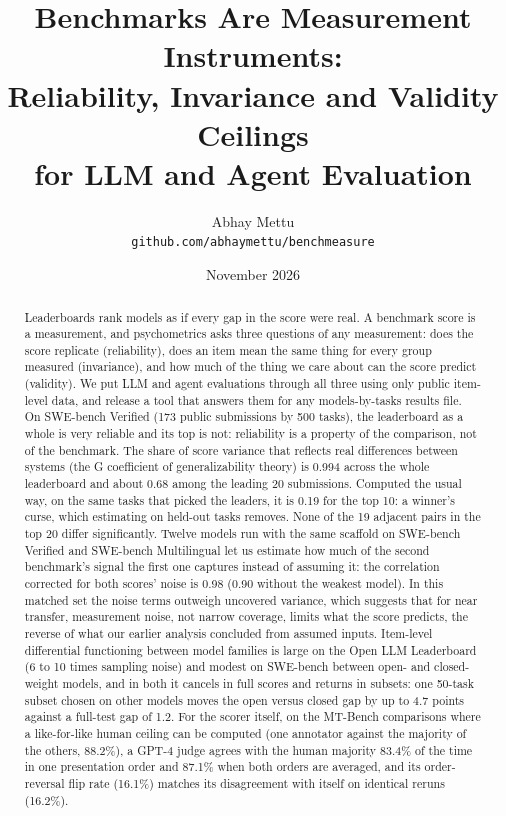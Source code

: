 \documentclass[11pt]{article}
\title{Benchmarks Are Measurement Instruments:\\Reliability, Invariance and Validity Ceilings\\for LLM and Agent Evaluation}
\author{Abhay Mettu\\\small\texttt{github.com/abhaymettu/benchmeasure}}
\date{November 2026}
\begin{document}
\maketitle

\begin{abstract}
Leaderboards rank models as if every gap in the score were real. A benchmark score is a measurement, and psychometrics asks three questions of any measurement: does the score replicate (reliability), does an item mean the same thing for every group measured (invariance), and how much of the thing we care about can the score predict (validity). We put LLM and agent evaluations through all three using only public item-level data, and release a tool that answers them for any models-by-tasks results file.
On SWE-bench Verified (173 public submissions by 500 tasks), the leaderboard as a whole is very reliable and its top is not: reliability is a property of the comparison, not of the benchmark. The share of score variance that reflects real differences between systems (the G coefficient of generalizability theory) is 0.994 across the whole leaderboard and about 0.68 among the leading 20 submissions. Computed the usual way, on the same tasks that picked the leaders, it is 0.19 for the top 10: a winner's curse, which estimating on held-out tasks removes. None of the 19 adjacent pairs in the top 20 differ significantly.
Twelve models run with the same scaffold on SWE-bench Verified and SWE-bench Multilingual let us estimate how much of the second benchmark's signal the first one captures instead of assuming it: the correlation corrected for both scores' noise is 0.98 (0.90 without the weakest model). In this matched set the noise terms outweigh uncovered variance, which suggests that for near transfer, measurement noise, not narrow coverage, limits what the score predicts, the reverse of what our earlier analysis concluded from assumed inputs.
Item-level differential functioning between model families is large on the Open LLM Leaderboard (6 to 10 times sampling noise) and modest on SWE-bench between open- and closed-weight models, and in both it cancels in full scores and returns in subsets: one 50-task subset chosen on other models moves the open versus closed gap by up to 4.7 points against a full-test gap of 1.2.
For the scorer itself, on the MT-Bench comparisons where a like-for-like human ceiling can be computed (one annotator against the majority of the others, 88.2\%), a GPT-4 judge agrees with the human majority 83.4\% of the time in one presentation order and 87.1\% when both orders are averaged, and its order-reversal flip rate (16.1\%) matches its disagreement with itself on identical reruns (16.2\%).
\end{abstract}
\end{document}
